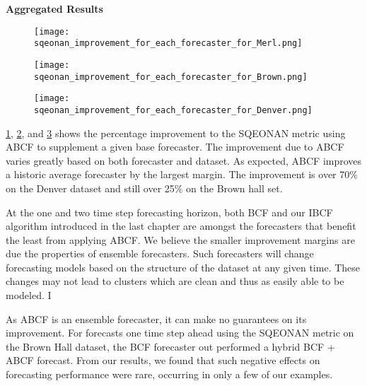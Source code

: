 \newpage


\bigskip
\noindent \textbf{Aggregated Results} 

\begin{figure}[!h]
	\begin{center}
		\texttt{[image: sqeonan\_improvement\_for\_each\_forecaster\_for\_Merl.png]}
	\end{center}
	\caption{}
	\label{fig:sqe_improve_merl}
\end{figure}

\begin{figure}[!h]
	\begin{center}
		\texttt{[image: sqeonan\_improvement\_for\_each\_forecaster\_for\_Brown.png]}
	\end{center}
	\caption{}
	\label{fig:sqe_improve_brown}
\end{figure}

\begin{figure}[!h]
	\begin{center}
		\texttt{[image: sqeonan\_improvement\_for\_each\_forecaster\_for\_Denver.png]}
	\end{center}
	\caption{}
	\label{fig:sqe_improve_denver}
\end{figure}


\ref{fig:sqe_improve_merl}, \ref{fig:sqe_improve_brown}, and \ref{fig:sqe_improve_denver} shows the percentage improvement to the SQEONAN metric using ABCF to supplement a given base forecaster.  The improvement due to ABCF varies greatly based on both forecaster and dataset.  As expected, ABCF improves a historic average forecaster by the largest margin.  The improvement is over 70\% on the Denver dataset and still over 25\% on the Brown hall set.

At the one and two time step forecasting horizon, both BCF and our IBCF algorithm introduced in the last chapter are amongst the forecasters that benefit the least from applying ABCF.  We believe the smaller improvement margins are due the properties of ensemble forecasters.  Such forecasters will change forecasting models based on the structure of the dataset at any given time.  These changes may not lead to clusters which are clean and thus as easily able to be modeled.  I

As ABCF is an ensemble forecaster, it can make no guarantees on its improvement.  For forecasts one time step ahead using the SQEONAN metric on the Brown Hall dataset, the BCF forecaster out performed a hybrid BCF + ABCF forecast.  From our results, we found that such negative effects on forecasting performance were rare, occurring in only a few of our examples.

